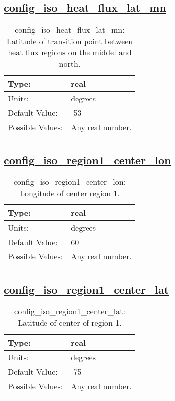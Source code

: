\subsection[config\_iso\_heat\_flux\_lat\_mn]{\hyperref[sec:nm_tab_iso]{config\_iso\_heat\_flux\_lat\_mn}}
\label{subsec:nm_sec_config_iso_heat_flux_lat_mn}
\begin{center}
\begin{longtable}{| p{2.0in} || p{4.0in} |}
    \hline
    Type: & real \\
    \hline
    Units: & \si{degrees} \\
    \hline
    Default Value: & -53 \\
    \hline
    Possible Values: & Any real number. \\
    \hline
    \caption{config\_iso\_heat\_flux\_lat\_mn: Latitude of transition point between heat flux regions on the middel and north.}
\end{longtable}
\end{center}
\subsection[config\_iso\_region1\_center\_lon]{\hyperref[sec:nm_tab_iso]{config\_iso\_region1\_center\_lon}}
\label{subsec:nm_sec_config_iso_region1_center_lon}
\begin{center}
\begin{longtable}{| p{2.0in} || p{4.0in} |}
    \hline
    Type: & real \\
    \hline
    Units: & \si{degrees} \\
    \hline
    Default Value: & 60 \\
    \hline
    Possible Values: & Any real number. \\
    \hline
    \caption{config\_iso\_region1\_center\_lon: Longitude of center region 1.}
\end{longtable}
\end{center}
\subsection[config\_iso\_region1\_center\_lat]{\hyperref[sec:nm_tab_iso]{config\_iso\_region1\_center\_lat}}
\label{subsec:nm_sec_config_iso_region1_center_lat}
\begin{center}
\begin{longtable}{| p{2.0in} || p{4.0in} |}
    \hline
    Type: & real \\
    \hline
    Units: & \si{degrees} \\
    \hline
    Default Value: & -75 \\
    \hline
    Possible Values: & Any real number. \\
    \hline
    \caption{config\_iso\_region1\_center\_lat: Latitude of center of region 1.}
\end{longtable}
\end{center}
